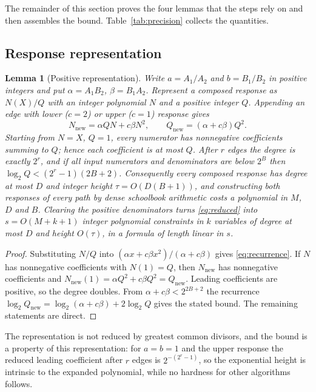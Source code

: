 \documentclass[11pt,a4paper]{article}
\theoremstyle{plain}
\newtheorem{lemma}[theorem]{Lemma}
\theoremstyle{definition}
\theoremstyle{remark}
\begin{document}
The remainder of this section proves the four lemmas that the steps rely on and then assembles the bound. Table~\ref{tab:precision} collects the quantities.

\subsection{Response representation}

\begin{lemma}[Positive representation]\label{lem:representation}
Write $a=A_1/A_2$ and $b=B_1/B_2$ in positive integers and put $\alpha=A_1B_2$, $\beta=B_1A_2$. Represent a composed response as $N(X)/Q$ with an integer polynomial $N$ and a positive integer $Q$. Appending an edge with lower ($c=2$) or upper ($c=1$) response gives
\begin{equation}\label{eq:recurrence}
  N_{\mathrm{new}}=\alpha QN+c\beta N^2,\qquad Q_{\mathrm{new}}=(\alpha+c\beta)Q^2 .
\end{equation}
Starting from $N=X$, $Q=1$, every numerator has nonnegative coefficients summing to $Q$; hence each coefficient is at most $Q$. After $r$ edges the degree is exactly $2^r$, and if all input numerators and denominators are below $2^B$ then $\log_2Q<(2^r-1)(2B+2)$. Consequently every composed response has degree at most $D$ and integer height $\tau=O(D(B+1))$, and constructing both responses of every path by dense schoolbook arithmetic costs a polynomial in $M$, $D$ and $B$. Clearing the positive denominators turns \eqref{eq:reduced} into $s=O(M+k+1)$ integer polynomial constraints in $k$ variables of degree at most $D$ and height $O(\tau)$, in a formula of length linear in $s$.
\end{lemma}

\begin{proof}
Substituting $N/Q$ into $(\alpha x+c\beta x^2)/(\alpha+c\beta)$ gives \eqref{eq:recurrence}. If $N$ has nonnegative coefficients with $N(1)=Q$, then $N_{\mathrm{new}}$ has nonnegative coefficients and $N_{\mathrm{new}}(1)=\alpha Q^2+c\beta Q^2=Q_{\mathrm{new}}$. Leading coefficients are positive, so the degree doubles. From $\alpha+c\beta<2^{2B+2}$ the recurrence $\log_2Q_{\mathrm{new}}=\log_2(\alpha+c\beta)+2\log_2Q$ gives the stated bound. The remaining statements are direct.
\end{proof}

The representation is not reduced by greatest common divisors, and the bound is a property of this representation: for $a=b=1$ and the upper response the reduced leading coefficient after $r$ edges is $2^{-(2^r-1)}$, so the exponential height is intrinsic to the expanded polynomial, while no hardness for other algorithms follows.
\end{document}
